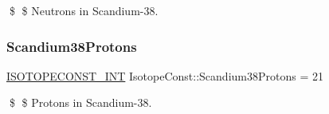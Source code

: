 \$ \$ Neutrons in Scandium-\/38. \mbox{\label{group___isotope_const-_scandium-_sc38_gab9be9953827bc012fc7d55dbade617be}} 
\subsubsection{\texorpdfstring{Scandium38\+Protons}{Scandium38Protons}}
{\footnotesize\ttfamily \mbox{\hyperlink{group___isotope_const-_macros_ga5f18360b3e99483a35c32d789e62621c}{I\+S\+O\+T\+O\+P\+E\+C\+O\+N\+S\+T\+\_\+\+I\+NT}} Isotope\+Const\+::\+Scandium38\+Protons = 21}

\$ \$ Protons in Scandium-\/38. 